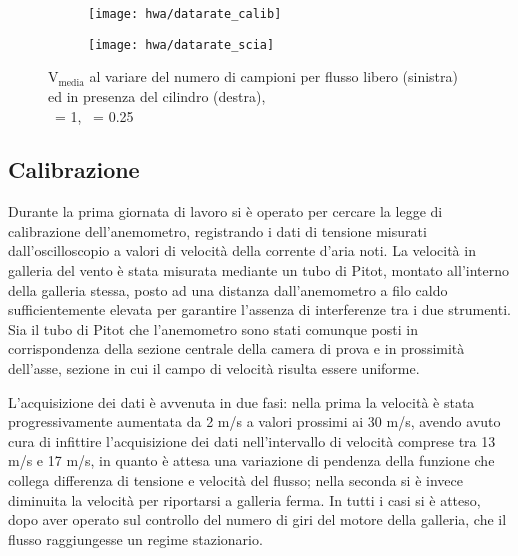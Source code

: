 \documentclass{article} %
\newcommand{\xd}{\nicefrac{\textrm{x}}{\textrm{D}}\ }
\newcommand{\yd}{\nicefrac{\textrm{y}}{\textrm{D}}\ }
\begin{document}
\begin{figure}[!ht]
    \begin{subfigure}{0.5\textwidth}
        \texttt{[image: hwa/datarate\_calib]}
    \end{subfigure}
    \begin{subfigure}{0.5\textwidth}
        \texttt{[image: hwa/datarate\_scia]}        
    \end{subfigure}
    \caption{V$_{\textrm{media}}$ al variare del numero di campioni per flusso libero (sinistra) ed in presenza del cilindro (destra),\\ \xd = 1, \yd = 0.25}
    \label{fig:datarate_hwa}
\end{figure}

\subsection{Calibrazione}
Durante la prima giornata di lavoro si è operato per cercare la legge di calibrazione dell'anemometro, registrando i dati di tensione misurati dall'oscilloscopio a valori di velocità della corrente d'aria noti. La velocità in galleria del vento è stata misurata mediante un tubo di Pitot, montato all'interno della galleria stessa, posto ad una distanza dall'anemometro a filo caldo sufficientemente elevata per garantire l'assenza di interferenze tra i due strumenti. Sia il tubo di Pitot che l'anemometro sono stati comunque posti in corrispondenza della sezione centrale della camera di prova e in prossimità dell'asse, sezione in cui il campo di velocità risulta essere uniforme.\par
L'acquisizione dei dati è avvenuta in due fasi: nella prima la velocità è stata progressivamente aumentata da 2 m/s a valori prossimi ai 30 m/s, avendo avuto cura di infittire l'acquisizione dei dati nell'intervallo di velocità comprese tra 13 m/s e 17 m/s, in quanto è attesa una variazione di pendenza della funzione che collega differenza di tensione e velocità del flusso; nella seconda si è invece diminuita la velocità per riportarsi a galleria ferma. In tutti i casi si è atteso, dopo aver operato sul controllo del numero di giri del motore della galleria, che il flusso raggiungesse un regime stazionario.\par
\end{document}
